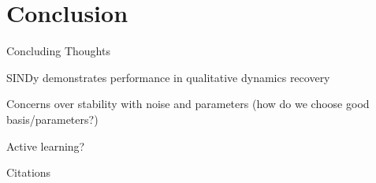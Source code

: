 \documentclass[aspectratio=169]{beamer}
\begin{document}
\section{Conclusion}
\begin{frame}{Concluding Thoughts}
	\begin{vfilleditems}
		\item SINDy demonstrates performance in qualitative dynamics recovery 
		\item Concerns over stability with noise and parameters (how do we choose good basis/parameters?)
		\item Active learning?
	\end{vfilleditems}
\end{frame}

\begin{frame}{Citations}
	\nocite{sindy}
	
	\printbibliography

	\vfill
\end{frame}
\end{document}

